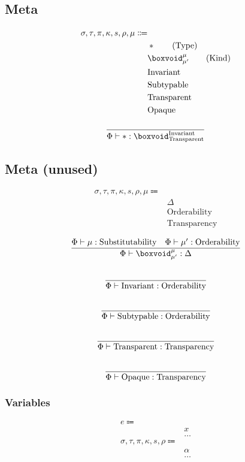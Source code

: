 \documentclass {article}
\begin{document}
\subsection{Meta}
\begin{align*}
\sigma, \tau, \pi, \kappa, s, \rho, \mu \Coloneqq & \\
& * \tag{Type} \\
& \boxvoid^\mu_{\mu'} \tag{Kind} \\
& \text{Invariant} \\
& \text{Subtypable} \\
& \text{Transparent} \\
& \text{Opaque}
\end{align*}

\begin{gather*}
\frac
{}
{\Phi \vdash * : \boxvoid^\text{Invariant}_{\text{Transparent}}} \\
\end{gather*}

\subsection{Meta (unused)}
\begin{align*}
\sigma, \tau, \pi, \kappa, s, \rho, \mu \Coloneqq & \\
& \Delta \tag{Sort} \\
& \text{Orderability} \\
& \text{Transparency}
\end{align*}

\begin{gather*}
\frac
{\Phi \vdash \mu : \text{Substitutability} \quad \Phi \vdash \mu' : \text{Orderability} }
{\Phi \vdash \boxvoid^\mu_{\mu'} : \Delta} \\
\\
\frac
{}
{\Phi \vdash \text{Invariant} : \text{Orderability}} \\
\\
\frac
{}
{\Phi \vdash \text{Subtypable} : \text{Orderability}} \\
\\
\frac
{}
{\Phi \vdash \text{Transparent} : \text{Transparency}} \\
\\
\frac
{}
{\Phi \vdash \text{Opaque} : \text{Transparency}}
\end{gather*}
    

\subsubsection{Variables}
\begin{align*}
e \Coloneqq & \\
& x \tag{Variable} \\
& \dots \\
\sigma, \tau, \pi, \kappa, s, \rho \Coloneqq & \\
& \alpha \tag{Type Variable} \\
& \dots
\end{align*}
\end{document}
